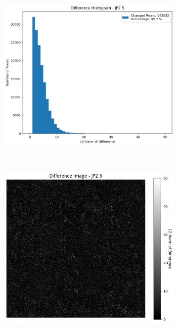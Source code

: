 \begin{figure}[htb]
\begin{subfigure}[b]{0.48\textwidth}
        \includegraphics[width=\textwidth]{doc/thesis/0_figures/compare_quality/set1/jp2_5_center_diff_histogram.png}
        \caption{}
        \label{fig:img_quality_comp_jp2_5_center_histo}
    \end{subfigure}
    \\
    \begin{subfigure}[b]{0.48\textwidth}
        \centering
        \includegraphics[width=\textwidth]{doc/thesis/0_figures/compare_quality/set1/jp2_5_center_diff_heatmap.png}

\end{subfigure}
\end{figure}
